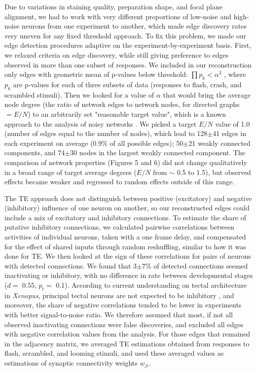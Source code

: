 \documentclass{article}
\begin{document}
Due to variations in staining quality, preparation shape, and focal plane alignment, we had to work with very different proportions of low-noise and high-noise neurons from one experiment to another, which made edge discovery rates very uneven for any fixed threshold approach. To fix this problem, we made our edge detection procedures adaptive on the experiment-by-experiment basis. First, we relaxed criteria on edge discovery, while still giving preference to edges observed in more than one subset of responses. We included in our reconstruction only edges with geometric mean of p-values below threshold: $\prod{p_k}<\alpha^3$ , where $p_k$ are p-values for each of three subsets of data (responses to flash, crash, and scrambled stimuli). Then we looked for a value of $\alpha$ that would bring the average node degree (the ratio of network edges to network nodes, for directed graphs $=E/N$) to an arbitrarily set "reasonable target value", which is a known approach to the analysis of noisy networks \citep{stetter2012te}. We picked a target $E/N$ value of 1.0 (number of edges equal to the number of nodes), which lead to 128$\pm$41 edges in each experiment on average (0.9\% of all possible edges); 50$\pm$21 weakly connected components, and 74$\pm$30 nodes in the largest weakly connected component. The comparison of network properties (Figures 5 and 6) did not change qualitatively in a broad range of target average degrees ($E/N$ from $\sim$ 0.5 to 1.5), but observed effects became weaker and regressed to random effects outside of this range. 

The TE approach does not distinguish between positive (excitatory) and negative (inhibitory) influence of one neuron on another, so our reconstructed edges could include a mix of excitatory and inhibitory connections. To estimate the share of putative inhibitory connections, we calculated pairwise correlations between activities of individual neurons, taken with a one frame delay, and compensated for the effect of shared inputs through random reshuffling, similar to how it was done for TE. We then looked at the sign of these correlations for pairs of neurons with detected connections. We found that 3$\pm$7\% of detected connections seemed inactivating or inhibitory, with no difference in rate between developmental stages ($d=$ 0.55, $p_t=$ 0.1). According to current understanding on tectal architecture in \textit{Xenopus}, principal tectal neurons are not expected to be inhibitory \citep{bell2011polyamines}, and moreover, the share of negative correlations tended to be lower in experiments with better signal-to-noise ratio. We therefore assumed that most, if not all observed inactivating connections were false discoveries, and excluded all edges with negative correlation values from the analysis. For those edges that remained in the adjacency matrix, we averaged TE estimations obtained from responses to flash, scrambled, and looming stimuli, and used these averaged values as estimations of synaptic connectivity weights $w_{ji}$.
\end{document}
